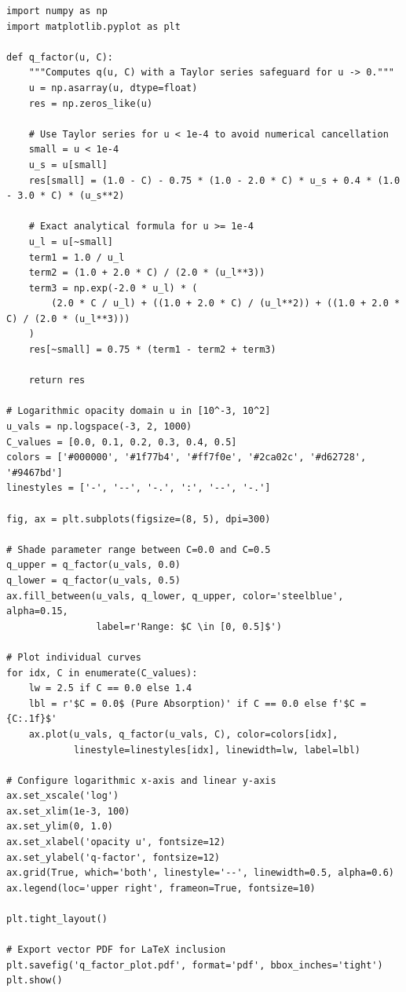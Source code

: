 \begin{lstlisting}[style=pythonstyle, caption={Python script for computing and plotting the scattering-corrected $q$-factor over a logarithmic opacity domain.}, label={lst:q_factor_plot}]
import numpy as np
import matplotlib.pyplot as plt

def q_factor(u, C):
    """Computes q(u, C) with a Taylor series safeguard for u -> 0."""
    u = np.asarray(u, dtype=float)
    res = np.zeros_like(u)
    
    # Use Taylor series for u < 1e-4 to avoid numerical cancellation
    small = u < 1e-4
    u_s = u[small]
    res[small] = (1.0 - C) - 0.75 * (1.0 - 2.0 * C) * u_s + 0.4 * (1.0 - 3.0 * C) * (u_s**2)
    
    # Exact analytical formula for u >= 1e-4
    u_l = u[~small]
    term1 = 1.0 / u_l
    term2 = (1.0 + 2.0 * C) / (2.0 * (u_l**3))
    term3 = np.exp(-2.0 * u_l) * (
        (2.0 * C / u_l) + ((1.0 + 2.0 * C) / (u_l**2)) + ((1.0 + 2.0 * C) / (2.0 * (u_l**3)))
    )
    res[~small] = 0.75 * (term1 - term2 + term3)
    
    return res

# Logarithmic opacity domain u in [10^-3, 10^2]
u_vals = np.logspace(-3, 2, 1000)
C_values = [0.0, 0.1, 0.2, 0.3, 0.4, 0.5]
colors = ['#000000', '#1f77b4', '#ff7f0e', '#2ca02c', '#d62728', '#9467bd']
linestyles = ['-', '--', '-.', ':', '--', '-.']

fig, ax = plt.subplots(figsize=(8, 5), dpi=300)

# Shade parameter range between C=0.0 and C=0.5
q_upper = q_factor(u_vals, 0.0)
q_lower = q_factor(u_vals, 0.5)
ax.fill_between(u_vals, q_lower, q_upper, color='steelblue', alpha=0.15,
                label=r'Range: $C \in [0, 0.5]$')

# Plot individual curves
for idx, C in enumerate(C_values):
    lw = 2.5 if C == 0.0 else 1.4
    lbl = r'$C = 0.0$ (Pure Absorption)' if C == 0.0 else f'$C = {C:.1f}$'
    ax.plot(u_vals, q_factor(u_vals, C), color=colors[idx],
            linestyle=linestyles[idx], linewidth=lw, label=lbl)

# Configure logarithmic x-axis and linear y-axis
ax.set_xscale('log')
ax.set_xlim(1e-3, 100)
ax.set_ylim(0, 1.0)
ax.set_xlabel('opacity u', fontsize=12)
ax.set_ylabel('q-factor', fontsize=12)
ax.grid(True, which='both', linestyle='--', linewidth=0.5, alpha=0.6)
ax.legend(loc='upper right', frameon=True, fontsize=10)

plt.tight_layout()

# Export vector PDF for LaTeX inclusion
plt.savefig('q_factor_plot.pdf', format='pdf', bbox_inches='tight')
plt.show()
\end{lstlisting}
%


